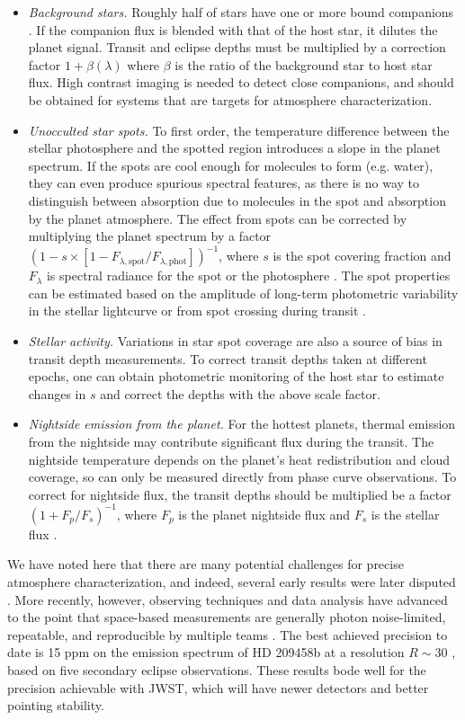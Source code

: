 \documentclass[graybox,natbib,nosecnum]{svmult}
\begin{document}
\begin{itemize}
\item{\emph{Background stars.} Roughly half of stars have one or more bound companions \citep{raghavan10}. If the companion flux is blended with that of the host star, it dilutes the planet signal. Transit and eclipse depths must be multiplied by a correction factor $1 + \beta(\lambda)$ where $\beta$ is the ratio of the background star to host star flux. High contrast imaging is needed to detect close companions, and should be obtained for systems that are targets for atmosphere characterization.}
\item{\emph{Unocculted star spots.} To first order, the temperature difference between the stellar photosphere and the spotted region introduces a slope in the planet spectrum. If the spots are cool enough for molecules to form (e.g. water), they can even produce spurious spectral features, as there is no way to distinguish between absorption due to molecules in the spot and absorption by the planet atmosphere. The effect from spots can be corrected by multiplying the planet spectrum by a factor $(1-s\times[1-F_{\lambda,\mathrm{spot}}/F_{\lambda,\mathrm{phot}}])^{-1}$, where $s$ is the spot covering fraction and $F_\lambda$ is spectral radiance for the spot or the photosphere \citep{mccullough14}. The spot properties can be estimated based on the amplitude of long-term photometric variability in the stellar lightcurve or from spot crossing during transit \citep[e.g.][]{pont08}.} 
\item{\emph{Stellar activity.} Variations in star spot coverage are also a source of bias in transit depth measurements. To correct transit depths taken at different epochs, one can obtain photometric monitoring of the host star to estimate changes in $s$ and correct the depths with the above scale factor.} 
\item{\emph{Nightside emission from the planet.} For the hottest planets, thermal emission from the nightside may contribute significant flux during the transit. The nightside temperature depends on the planet's heat redistribution and cloud coverage, so can only be measured directly from phase curve observations. To correct for nightside flux, the transit depths should be multiplied be a factor $(1 + F_p/F_s)^{-1}$, where $F_p$ is the planet nightside flux and $F_s$ is the stellar flux \citep{kipping10}.} 
\end{itemize}

We have noted here that there are many potential challenges for precise atmosphere characterization, and indeed, several early results were later disputed \citep[e.g.][]{tinetti07, swain08, gibson11}. More recently, however, observing techniques and data analysis have advanced to the point that space-based measurements are generally photon noise-limited, repeatable, and reproducible by multiple teams \citep[e.g.][]{deming13, kreidberg14a, ingalls16}. The best achieved precision to date is 15 ppm on the emission spectrum of HD 209458b at a resolution $R\sim 30$ \citep{line16}, based on five secondary eclipse observations. These results bode well for the precision achievable with JWST, which will have newer detectors and better pointing stability. 
\end{document}
